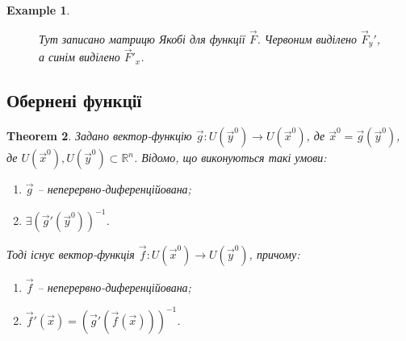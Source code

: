 \documentclass[a4paper, 10pt]{article}
\def\departial#1#2{\dfrac{\partial {#1}}{\partial {#2}}}
\theoremstyle{theoremdd}
\newtheorem{theorem}{Theorem}[subsection]
\theoremstyle{theoremdd}
\theoremstyle{theoremdd}
\theoremstyle{theoremdd}
\theoremstyle{theoremdd}
\newtheorem{example}[theorem]{Example}
\theoremstyle{theoremdd}
\theoremstyle{theoremdd}
\theoremstyle{theoremdd}
\theoremstyle{theoremdd}
\begin{document}
\begin{example}
\begin{figure}[H]
\centering
{}
\caption*{Тут записано матрицю Якобі для функції $\vec{F}$. Червоним виділено $\vec{F}_y'$, а синім виділено $\vec{F}'_x$.}
\end{figure}
\end{example}

\subsection{Обернені функції}
\begin{theorem}
Задано вектор-функцію $\vec{g}\colon U(\vec{y}^0) \to U(\vec{x}^0)$, де $\vec{x}^0 = \vec{g}(\vec{y}^0)$, де $U(\vec{x}^0), U(\vec{y}^0) \subset \mathbb{R}^n$. Відомо, що виконуються такі умови:
\begin{enumerate}[nosep,wide=0pt,label={\arabic*)}]
\item $\vec{g}$ -- неперервно-диференційована;
\item $\exists (\vec{g}'(\vec{y}^0))^{-1}$.
\end{enumerate}
Тоді існує вектор-функція $\vec{f}\colon U(\vec{x}^0) \to U(\vec{y}^0)$, причому:
\begin{enumerate}[nosep,wide=0pt,label={\arabic*)}]
\item $\vec{f}$ -- неперервно-диференційована;
\item $\vec{f}'(\vec{x}) = (\vec{g}'(\vec{f}(\vec{x})))^{-1}$.
\end{enumerate}
\iffalse
\textit{Вказівка: розглянути функцію $\vec{F}(\vec{x},\vec{y}) = \vec{x} - \vec{g}(\vec{y}) = \vec{0}$ та застосувати теорему про неявну вектор-функцію.}
\fi
\end{theorem}
\end{document}

